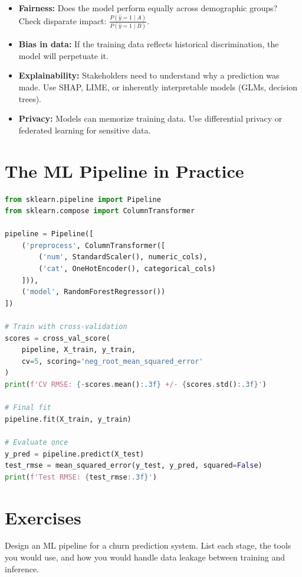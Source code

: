 \begin{itemize}
	\item \textbf{Fairness:} Does the model perform equally across demographic groups? Check disparate impact: $\frac{P(\hat{y}=1 \mid A)}{P(\hat{y}=1 \mid B)}$.
	\item \textbf{Bias in data:} If the training data reflects historical discrimination, the model will perpetuate it.
	\item \textbf{Explainability:} Stakeholders need to understand why a prediction was made. Use SHAP, LIME, or inherently interpretable models (GLMs, decision trees).
	\item \textbf{Privacy:} Models can memorize training data. Use differential privacy or federated learning for sensitive data.
\end{itemize}

\section{The ML Pipeline in Practice}

\begin{lstlisting}[language=Python, caption=Complete pipeline sketch]
from sklearn.pipeline import Pipeline
from sklearn.compose import ColumnTransformer

pipeline = Pipeline([
    ('preprocess', ColumnTransformer([
        ('num', StandardScaler(), numeric_cols),
        ('cat', OneHotEncoder(), categorical_cols)
    ])),
    ('model', RandomForestRegressor())
])

# Train with cross-validation
scores = cross_val_score(
    pipeline, X_train, y_train,
    cv=5, scoring='neg_root_mean_squared_error'
)
print(f'CV RMSE: {-scores.mean():.3f} +/- {scores.std():.3f}')

# Final fit
pipeline.fit(X_train, y_train)

# Evaluate once
y_pred = pipeline.predict(X_test)
test_rmse = mean_squared_error(y_test, y_pred, squared=False)
print(f'Test RMSE: {test_rmse:.3f}')
\end{lstlisting}

\section{Exercises}

\begin{exercise}
	Design an ML pipeline for a churn prediction system. List each stage, the tools you would use, and how you would handle data leakage between training and inference.
\end{exercise}

